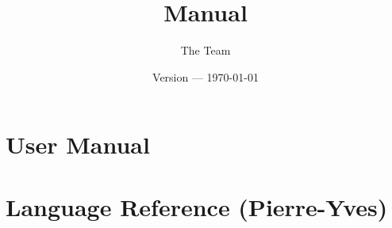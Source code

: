 \documentclass[a4paper,notitlepage]{book}
\title{\EC Manual}
\date{Version \ECversion --- \today}
\author{The \EC Team}
\begin{document}
\maketitle

\tableofcontents

\part{User Manual}






\part{Language Reference (Pierre-Yves)}

\printindex
\end{document}
